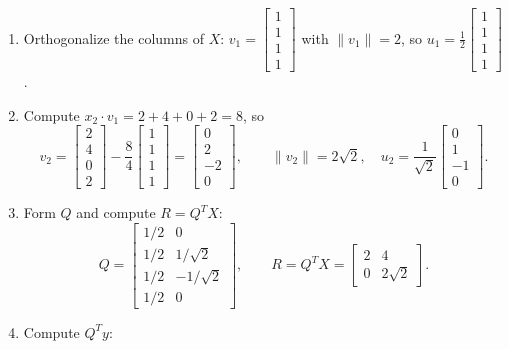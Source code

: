 \documentclass[11pt, letterpaper]{article}
\theoremstyle{definition}
\theoremstyle{remark}
\begin{document}
\begin{enumerate}[label=\textbf{Step \arabic*:}]
    \item Orthogonalize the columns of $X$: $v_1 = \begin{bmatrix} 1 \\ 1 \\ 1 \\ 1 \end{bmatrix}$ with $\|v_1\| = 2$, so $u_1 = \frac{1}{2}\begin{bmatrix} 1 \\ 1 \\ 1 \\ 1 \end{bmatrix}$.
    \item Compute $x_2 \cdot v_1 = 2 + 4 + 0 + 2 = 8$, so
    \[
        v_2 = \begin{bmatrix} 2 \\ 4 \\ 0 \\ 2 \end{bmatrix} - \frac{8}{4}\begin{bmatrix} 1 \\ 1 \\ 1 \\ 1 \end{bmatrix} = \begin{bmatrix} 0 \\ 2 \\ -2 \\ 0 \end{bmatrix}, \qquad \|v_2\| = 2\sqrt{2}, \quad u_2 = \frac{1}{\sqrt{2}}\begin{bmatrix} 0 \\ 1 \\ -1 \\ 0 \end{bmatrix}.
    \]
    \item Form $Q$ and compute $R = Q^T X$:
    \[
        Q = \begin{bmatrix}
            1/2 & 0 \\
            1/2 & 1/\sqrt{2} \\
            1/2 & -1/\sqrt{2} \\
            1/2 & 0
        \end{bmatrix}, \qquad
        R = Q^T X = \begin{bmatrix}
            2 & 4 \\
            0 & 2\sqrt{2}
        \end{bmatrix}.
    \]
    \item Compute $Q^T y$:

\end{enumerate}
\end{document}
